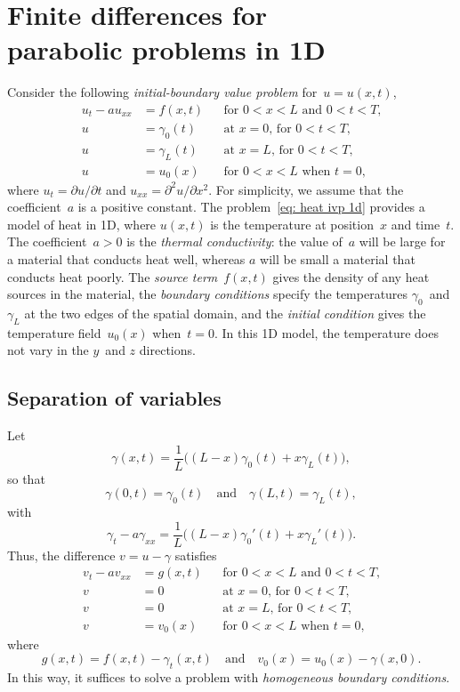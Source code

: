 \chapter[Finite differences for parabolic problems]{Finite differences for \\
parabolic problems in 1D}
Consider the following \emph{initial-boundary value problem} for~$u=u(x,t)$,
\begin{equation}\label{eq: heat ivp 1d}
\begin{aligned}
u_t-au_{xx}&=f(x,t)&&\text{for $0<x<L$ and $0<t<T$,}\\
u&=\gamma_0(t)&&\text{at $x=0$, for $0<t<T$,}\\
u&=\gamma_L(t)&&\text{at $x=L$, for $0<t<T$,}\\
u&=u_0(x)&&\text{for $0<x<L$ when $t=0$,}
\end{aligned}
\end{equation}
where $u_t=\partial u/\partial t$ and $u_{xx}=\partial^2u/\partial x^2$.  For 
simplicity, we assume that the coefficient~$a$ is a positive constant.  The 
problem~\eqref{eq: heat ivp 1d} provides a model of heat in 1D, where $u(x,t)$ 
is the temperature at position~$x$ and time~$t$.  The coefficient~$a>0$ 
is the \emph{thermal conductivity}: the value of~$a$ will be large for a 
material that conducts heat well, whereas $a$ will be small a material that 
conducts heat poorly.  The \emph{source term}~$f(x,t)$ gives the density of any 
heat sources in the material, the \emph{boundary conditions} specify the 
temperatures $\gamma_0$~and $\gamma_L$ at the two edges of the spatial domain, 
and the \emph{initial condition} gives the temperature field~$u_0(x)$ 
when~$t=0$.  In this 1D model, the temperature does not vary in the $y$~and $z$ 
directions.

\section{Separation of variables}

Let
\[
\gamma(x,t)=\frac{1}{L}\bigl((L-x)\gamma_0(t)+x\gamma_L(t)\bigr),
\]
so that
\[
\gamma(0,t)=\gamma_0(t)\quad\text{and}\quad\gamma(L,t)=\gamma_L(t),
\]
with
\[
\gamma_t-a\gamma_{xx}=\frac{1}{L}\bigl((L-x)\gamma_0'(t)+x\gamma_L'(t)\bigr).
\]
Thus, the difference $v=u-\gamma$ satisfies 
\begin{equation}\label{eq: heat ivp homog 1d}
\begin{aligned}
v_t-av_{xx}&=g(x,t)&&\text{for $0<x<L$ and $0<t<T$,}\\
v&=0&&\text{at $x=0$, for $0<t<T$,}\\
v&=0&&\text{at $x=L$, for $0<t<T$,}\\
v&=v_0(x)&&\text{for $0<x<L$ when $t=0$,}
\end{aligned}
\end{equation}
where 
\[
g(x,t)=f(x,t)-\gamma_t(x,t)
\quad\text{and}\quad
v_0(x)=u_0(x)-\gamma(x,0).
\]
In this way, it suffices to solve a problem with \emph{homogeneous boundary 
conditions}.


